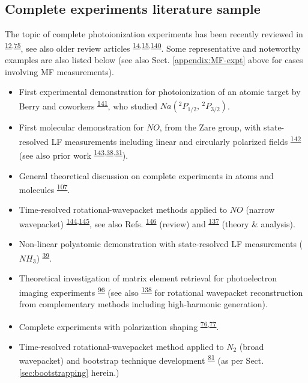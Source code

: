 \documentclass[10pt]{article}
\begin{document}
\subsection{Complete experiments literature sample\label{sec:CompleteLit}}


The topic of complete photoionization experiments has been recently reviewed in \textsuperscript{\hyperref[csl:12]{12},\hyperref[csl:75]{75}}, see also older review articles \textsuperscript{\hyperref[csl:14]{14},\hyperref[csl:15]{15},\hyperref[csl:140]{140}}. Some representative and noteworthy examples are also listed below (see also Sect. \ref{appendix:MF-expt} above for cases involving MF measurements).

\begin{itemize}
\item First experimental demonstration for photoionization of an atomic target by Berry and coworkers \textsuperscript{\hyperref[csl:141]{141}}, who studied
$Na(^{2}P_{1/2},\,^{2}P_{3/2})$.
\item First molecular demonstration for $NO$, from the Zare group, with state-resolved LF measurements including linear and circularly polarized fields \textsuperscript{\hyperref[csl:142]{142}} (see also prior work \textsuperscript{\hyperref[csl:143]{143},\hyperref[csl:38]{38},\hyperref[csl:31]{31}}).
\item General theoretical discussion on complete experiments in atoms and molecules \textsuperscript{\hyperref[csl:107]{107}}.
\item Time-resolved rotational-wavepacket methods applied to $NO$ (narrow wavepacket) \textsuperscript{\hyperref[csl:144]{144},\hyperref[csl:145]{145}}, see also Refs. \textsuperscript{\hyperref[csl:146]{146}} (review) and \textsuperscript{\hyperref[csl:137]{137}} (theory \& analysis).
\item Non-linear polyatomic demonstration with state-resolved LF measurements ($NH_3$) \textsuperscript{\hyperref[csl:39]{39}}.
\item Theoretical investigation of matrix element retrieval for photoelectron imaging experiments \textsuperscript{\hyperref[csl:96]{96}} (see also \textsuperscript{\hyperref[csl:138]{138}} for rotational wavepacket reconstruction from complementary methods including high-harmonic generation).  
\item Complete experiments with polarization shaping \textsuperscript{\hyperref[csl:76]{76},\hyperref[csl:77]{77}}.
\item Time-resolved rotational-wavepacket method applied to $N_2$ (broad wavepacket) and bootstrap technique development \textsuperscript{\hyperref[csl:81]{81}} (as per Sect. \ref{sec:bootstrapping} herein.)
\end{itemize} 
\end{document}
